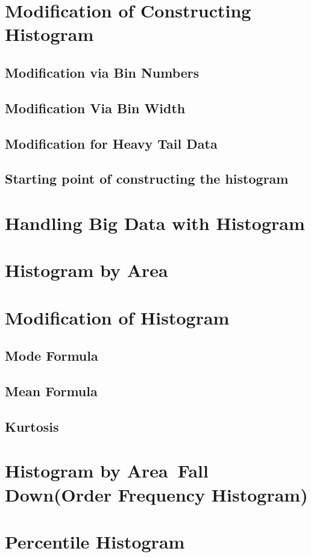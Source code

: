 \section{Modification of Constructing Histogram}

\subsection{Modification via Bin Numbers}

\subsection{Modification Via Bin Width}

\subsection{Modification for Heavy Tail Data}

\subsection{Starting point of constructing the histogram}

\section{Handling Big Data with Histogram}

\section{Histogram by Area}


\section{Modification  of Histogram} 
\subsection{Mode Formula}
\subsection{Mean Formula}
\subsection{Kurtosis}

\section{Histogram by Area\ Fall Down(Order Frequency Histogram)}

\section{Percentile Histogram}


\addblankpage %
